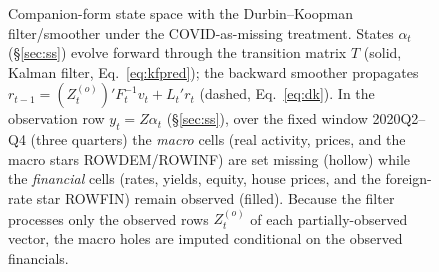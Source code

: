 \documentclass[11pt]{article}
\theoremstyle{plain}
\theoremstyle{remark}
\begin{document}
\begin{figure}[!ht]
\caption{Companion-form state space with the Durbin--Koopman
filter/smoother under the COVID-as-missing treatment.  States
$\alpha_t$ (\S\ref{sec:ss}) evolve forward through the transition
matrix $T$ (solid, Kalman filter, Eq.~\eqref{eq:kfpred}); the
backward smoother propagates
$r_{t-1}=(Z_t^{(o)})'F_t^{-1}v_t+L_t'r_t$
(dashed, Eq.~\eqref{eq:dk}).  In the observation row
$y_t=Z\alpha_t$ (\S\ref{sec:ss}), over the fixed window
2020Q2--Q4 (three quarters) the \emph{macro} cells (real activity,
prices, and the macro stars ROWDEM/ROWINF) are set missing (hollow)
while the \emph{financial} cells (rates, yields, equity, house prices,
and the foreign-rate star ROWFIN) remain observed (filled).  Because
the filter processes only the observed rows $Z_t^{(o)}$ of each
partially-observed vector, the macro holes are imputed conditional on
the observed financials.}
\label{fig:statespace-dk}
\end{figure}
\end{document}
